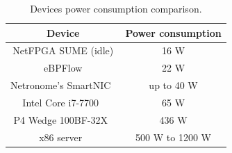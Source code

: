


\begin{table}[h] %
\centering
\caption{Devices power consumption comparison.}
\label{tab:powerconsumption}
\begin{tabular}{|c|c|}
\hline \textbf{Device} & \textbf{Power consumption} \\ \hline
NetFPGA SUME (idle)  & 16 W \\ \hline
eBPFlow  & 22 W \\ \hline
Netronome's SmartNIC~\cite{NetronomePC} & up to 40 W \\ \hline
Intel Core i7-7700~\cite{i7i7700} & 65 W \\ \hline
P4 Wedge 100BF-32X~\cite{P4wedge} & 436 W \\ \hline
x86 server~\cite{x86serverPC} & 500 W to 1200 W \\ \hline
\end{tabular}
\end{table}


